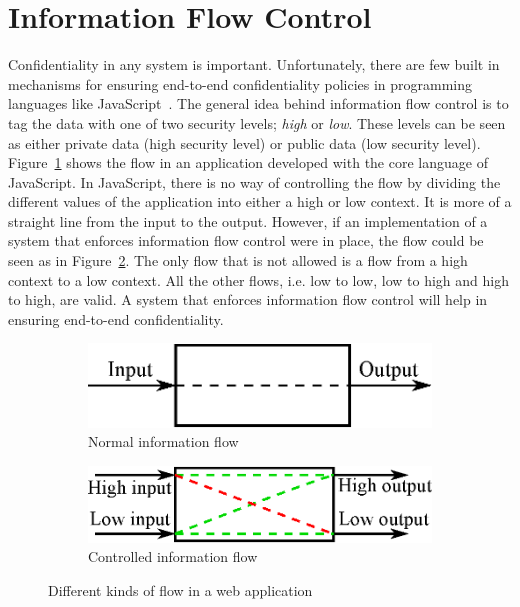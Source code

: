 \section{Information Flow Control}
Confidentiality in any system is important. Unfortunately, there are few built in mechanisms for ensuring end-to-end confidentiality policies in programming languages like JavaScript~\cite{ifc-jsac}. The general idea behind information flow control is to tag the data with one of two security levels; \emph{high} or \emph{low}. These levels can be seen as either private data (high security level) or public data (low security level). Figure~\ref{fig:normal_flow} shows the flow in an application developed with the core language of JavaScript. In JavaScript, there is no way of controlling the flow by dividing the different values of the application into either a high or low context. It is more of a straight line from the input to the output. However, if an implementation of a system that enforces information flow control were in place, the flow could be seen as in Figure~\ref{fig:controlled_flow}. The only flow that is not allowed is a flow from a high context to a low context. All the other flows, i.e. low to low, low to high and high to high, are valid. A system that enforces information flow control will help in ensuring end-to-end confidentiality.
\begin{figure}[h]
  \begin{subfigure}{.5\textwidth}
    \includegraphics[scale=0.65]{images/flow_normal.eps}
    \caption{Normal information flow}
    \label{fig:normal_flow}
  \end{subfigure}
  \begin{subfigure}{.5\textwidth}
    \includegraphics[scale=0.65]{images/flow_controlled.eps}
    \caption{Controlled information flow}
    \label{fig:controlled_flow}
  \end{subfigure}
  \caption{Different kinds of flow in a web application}
  \label{fig:flows}
\end{figure}
